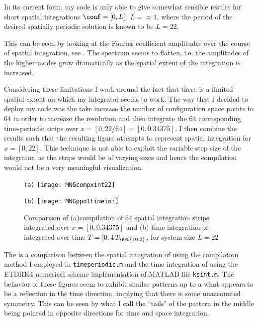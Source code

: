 \begin{itemize}
In its current form, my code is only able to give somewhat sensible
results for short spatial integrations $\conf = [0, L]$, $L = \approx 1$,
where the period of the desired spatially periodic solution is known to
be $L=22$.

This can be seen by looking at the Fourier coefficient amplitudes over
the course of spatial integration, see . The spectrum
seems to flatten, i.e. the amplitudes of the higher modes grow
dramatically as the spatial extent of the integration is increased.

Considering these limitations I work around the fact that there is a
limited spatial extent on which my integrator seems to work. The way that
I decided to deploy my code was the take increase the number of
configuration space points to 64 in order to increase the resolution and
then integrate the 64 corresponding time-periodic strips over $x = [0,
22/64] = [0, 0.34375]$. I then combine the results such that the
resulting figure attempts to represent spatial integration for $x =
[0,22]$. This technique is not able to exploit the variable step size of
the integrator, as the strips would be of varying sizes and hence the
compilation would not be a very meaningful visualization.

\begin{figure}[h]
  \begin{minipage}[height=.40\textheight]{.35\textwidth}
    \centering \small{\texttt{(a)}}
    \texttt{[image: MNGcompxint22]}
  \end{minipage}
  \begin{minipage}[height=.40\textheight]{.35\textwidth}
    \centering \small{\texttt{(b)}}
    \texttt{[image: MNGppo1timeint]}
  \end{minipage}
   \caption{Comparison of (a)compilation of 64 spatial integration strips integrated over $x=[0,0.34375]$ and (b) time integration of  integrated over time $T = [0,4\,T_{\PPO{10.2}}$, for system size $L=22$}
  \label{fig:MNGrfig2}
\end{figure}

The  is a comparison between the spatial integration
of  using the compilation method I employed in
\texttt{timeperiodic.m} and the time integration of 
using the ETDRK4 numerical scheme implementation of MATLAB file
\texttt{ksint.m}. The behavior of these figures seem to exhibit similar
patterns up to a what appears to be a reflection in the time direction,
implying that there is some unaccounted symmetry. This can be seen by
what I call the ``tails" of the pattern in the middle being pointed in
opposite directions for time and space integration.


\end{itemize}
